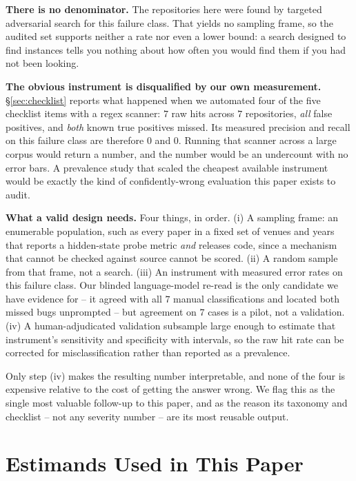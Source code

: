 \documentclass{article}
\begin{document}
\textbf{There is no denominator.} The repositories here were found by targeted
adversarial search for this failure class. That yields no sampling frame, so
the audited set supports neither a rate nor even a lower bound: a search
designed to find instances tells you nothing about how often you would find
them if you had not been looking.

\textbf{The obvious instrument is disqualified by our own measurement.}
\S\ref{sec:checklist} reports what happened when we automated four of the five
checklist items with a regex scanner: $7$ raw hits across $7$ repositories,
\emph{all} false positives, and \emph{both} known true positives missed. Its
measured precision and recall on this failure class are therefore $0$ and $0$.
Running that scanner across a large corpus would return a number, and the
number would be an undercount with no error bars. A prevalence study that
scaled the cheapest available instrument would be exactly the kind of
confidently-wrong evaluation this paper exists to audit.

\textbf{What a valid design needs.} Four things, in order. (i) A sampling
frame: an enumerable population, such as every paper in a fixed set of venues
and years that reports a hidden-state probe metric \emph{and} releases code,
since a mechanism that cannot be checked against source cannot be scored.
(ii) A random sample from that frame, not a search. (iii) An instrument with
measured error rates on this failure class. Our blinded language-model re-read
is the only candidate we have evidence for -- it agreed with all $7$ manual
classifications and located both missed bugs unprompted -- but agreement on
$7$ cases is a pilot, not a validation. (iv) A human-adjudicated validation
subsample large enough to estimate that instrument's sensitivity and
specificity with intervals, so the raw hit rate can be corrected for
misclassification rather than reported as a prevalence.

Only step (iv) makes the resulting number interpretable, and none of the four
is expensive relative to the cost of getting the answer wrong. We flag this as
the single most valuable follow-up to this paper, and as the reason its
taxonomy and checklist -- not any severity number -- are its most reusable
output.

\section{Estimands Used in This Paper}
\label{app:estimands}
\end{document}
